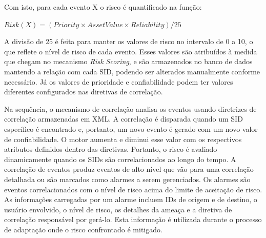 \documentclass[tid,table]{texufpel} %
\begin{document}
Com isto, para cada evento X o risco é quantificado na função:

\begin{center}
\begin{math}
Risk(X) = (Priority \times AssetV alue \times Reliability)/25 
\end{math}
\end{center}

A divisão de 25 é feita para manter os valores de risco no intervalo de 0 a 10, o que reflete o nível de risco de cada evento. Esses valores são atribuídos à medida que chegam no mecanismo \textit{Risk Scoring}, e são armazenados no banco de dados mantendo a relação com cada SID, podendo ser alterados manualmente conforme necessário. Já os valores de prioridade e confiabilidade podem ter valores diferentes configurados nas diretivas de correlação.

Na sequência, o mecanismo de correlação analisa os eventos usando diretrizes de correlação armazenadas em XML. A correlação é disparada quando um SID específico é encontrado e, portanto, um novo evento é gerado com um novo valor de confiabilidade. O motor aumenta e diminui esse valor com os respectivos atributos definidos dentro das diretivas. Portanto, o risco é avaliado dinamicamente quando os SIDs são correlacionados ao longo do tempo. A correlação de eventos produz eventos de alto nível que vão para uma correlação detalhada ou são marcados como alarmes a serem gerenciados. Os alarmes são eventos correlacionados com o nível de risco acima do limite de aceitação de risco. As informações carregadas por um alarme incluem IDs de origem e de destino, o usuário envolvido, o nível de risco, os detalhes da ameaça e a diretiva de correlação responsável por gerá-lo. Esta informação é utilizada durante o processo de adaptação onde o risco confrontado é mitigado.

\end{document}
